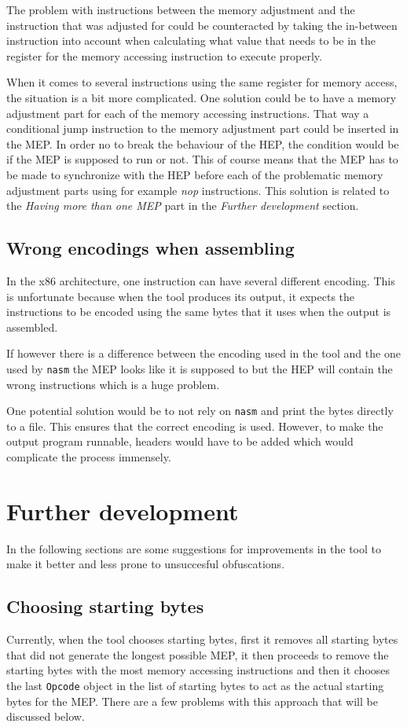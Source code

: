 \documentclass[11pt,twoside]{eitExjobb}
\begin{document}
The problem with instructions between the memory adjustment and the instruction that was adjusted for could be counteracted by taking the in-between instruction into account when calculating what value that needs to be in the register for the memory accessing instruction to execute properly. 

When it comes to several instructions using the same register for memory access, the situation is a bit more complicated. One solution could be to have a memory adjustment part for each of the memory accessing instructions. That way a conditional jump instruction to the memory adjustment part could be inserted in the MEP. In order no to break the behaviour of the HEP, the condition would be if the MEP is supposed to run or not. This of course means that the MEP has to be made to synchronize with the HEP before each of the problematic memory adjustment parts using for example \emph{nop} instructions. This solution is related to the \emph{Having more than one MEP} part in the \emph{Further development} section. 

\subsection{Wrong encodings when assembling}
In the x86 architecture, one instruction can have several different encoding. This is unfortunate because when the tool produces its output, it expects the instructions to be encoded using the same bytes that it uses when the output is assembled. 

If however there is a difference between the encoding used in the tool and the one used by \texttt{nasm} the MEP looks like it is supposed to but the HEP will contain the wrong instructions which is a huge problem.

One potential solution would be to not rely on \texttt{nasm} and print the bytes directly to a file. This ensures that the correct encoding is used. However, to make the output program runnable, headers would have to be added which would complicate the process immensely. 

\section{Further development}
In the following sections are some suggestions for improvements in the tool to make it better and less prone to unsuccesful obfuscations.

\subsection{Choosing starting bytes}
Currently, when the tool chooses starting bytes, first it removes all starting bytes that did not generate the longest possible MEP, it then proceeds to remove the starting bytes with the most memory accessing instructions and then it chooses the last \texttt{Opcode} object in the list of starting bytes to act as the actual starting bytes for the MEP. There are a few problems with this approach that will be discussed below.
\end{document}
